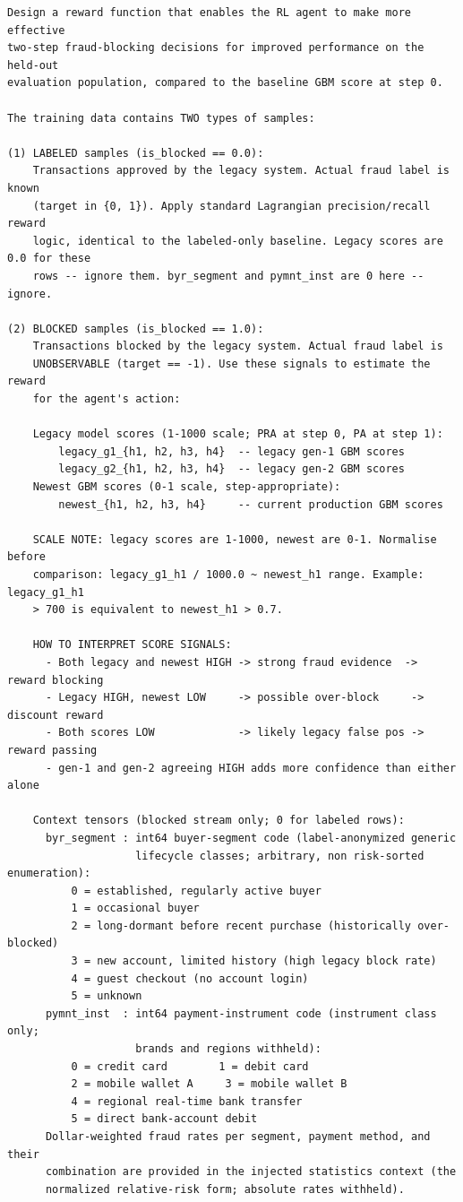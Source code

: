 \documentclass[11pt]{article}
\begin{document}
\begin{lstlisting}[basicstyle=\ttfamily\scriptsize,breaklines=true,numbers=none,frame=single,captionpos=b,caption={Dual-stream task description prompt (anonymized, ASCII).},label={lst:prompt_task}]
Design a reward function that enables the RL agent to make more effective
two-step fraud-blocking decisions for improved performance on the held-out
evaluation population, compared to the baseline GBM score at step 0.

The training data contains TWO types of samples:

(1) LABELED samples (is_blocked == 0.0):
    Transactions approved by the legacy system. Actual fraud label is known
    (target in {0, 1}). Apply standard Lagrangian precision/recall reward
    logic, identical to the labeled-only baseline. Legacy scores are 0.0 for these
    rows -- ignore them. byr_segment and pymnt_inst are 0 here -- ignore.

(2) BLOCKED samples (is_blocked == 1.0):
    Transactions blocked by the legacy system. Actual fraud label is
    UNOBSERVABLE (target == -1). Use these signals to estimate the reward
    for the agent's action:

    Legacy model scores (1-1000 scale; PRA at step 0, PA at step 1):
        legacy_g1_{h1, h2, h3, h4}  -- legacy gen-1 GBM scores
        legacy_g2_{h1, h2, h3, h4}  -- legacy gen-2 GBM scores
    Newest GBM scores (0-1 scale, step-appropriate):
        newest_{h1, h2, h3, h4}     -- current production GBM scores

    SCALE NOTE: legacy scores are 1-1000, newest are 0-1. Normalise before
    comparison: legacy_g1_h1 / 1000.0 ~ newest_h1 range. Example: legacy_g1_h1
    > 700 is equivalent to newest_h1 > 0.7.

    HOW TO INTERPRET SCORE SIGNALS:
      - Both legacy and newest HIGH -> strong fraud evidence  -> reward blocking
      - Legacy HIGH, newest LOW     -> possible over-block     -> discount reward
      - Both scores LOW             -> likely legacy false pos -> reward passing
      - gen-1 and gen-2 agreeing HIGH adds more confidence than either alone

    Context tensors (blocked stream only; 0 for labeled rows):
      byr_segment : int64 buyer-segment code (label-anonymized generic
                    lifecycle classes; arbitrary, non risk-sorted enumeration):
          0 = established, regularly active buyer
          1 = occasional buyer
          2 = long-dormant before recent purchase (historically over-blocked)
          3 = new account, limited history (high legacy block rate)
          4 = guest checkout (no account login)
          5 = unknown
      pymnt_inst  : int64 payment-instrument code (instrument class only;
                    brands and regions withheld):
          0 = credit card        1 = debit card
          2 = mobile wallet A     3 = mobile wallet B
          4 = regional real-time bank transfer
          5 = direct bank-account debit
      Dollar-weighted fraud rates per segment, payment method, and their
      combination are provided in the injected statistics context (the
      normalized relative-risk form; absolute rates withheld).


\end{lstlisting}
\end{document}
